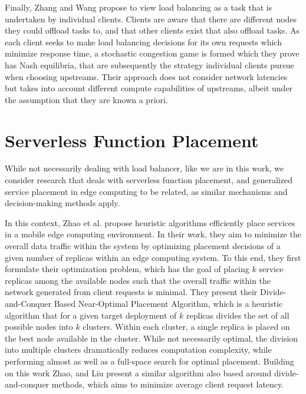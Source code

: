 \documentclass[draft,final]{vutinfth} %
\begin{document}
Finally, Zhang and Wang\cite{zhangStochasticCongestionGame2021} propose to view load balancing as a task that is undertaken by individual clients.
Clients are aware that there are different nodes they could offload tasks to, and that other clients exist that also offload tasks.
As each client seeks to make load balancing decisions for its own requests which minimize response time, a stochastic congestion game is formed\cite{zhangStochasticCongestionGame2021} which they prove has Nash equilibria, that are subsequently the strategy individual clients pursue when choosing upstreams.
Their approach does not consider network latencies but takes into account different compute capabilities of upstreams, albeit under the assumption that they are known a priori.


\section{Serverless Function Placement}
While not necessarily dealing with load balancer, like we are in this work, we consider research that deals with serverless function placement, and generalized service placement in edge computing to be related, as similar mechanisms and decision-making methods apply.

In this context, Zhao et al. \cite{zhaoOptimalPlacementVirtual2017} propose heuristic algorithms efficiently place services in a mobile edge computing environment.
In their work, they aim to minimize the overall data traffic within the system by optimizing placement decisions of a given number of replicas within an edge computing system.
To this end, they first formulate their optimization problem, which has the goal of placing $k$ service replicas among the available nodes such that the overall traffic within the network generated from client requests is minimal.
They present their Divide-and-Conquer Based Near-Optimal Placement Algorithm\cite{zhaoOptimalPlacementVirtual2017}, which is a heuristic algorithm that for a given target deployment of $k$ replicas divides the set of all possible nodes into $k$ clusters.
Within each cluster, a single replica is placed on the best node available in the cluster.
While not necessarily optimal, the division into multiple clusters dramatically reduces computation complexity, while performing almost as well as a full-space search for optimal placement.
Building on this work Zhao, and Liu\cite{zhaoOptimalPlacementVirtual2018} present a similar algorithm also based around divide-and-conquer methods, which aims to minimize average client request latency.
\end{document}

